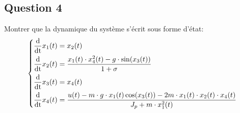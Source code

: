 \documentclass[class=article, crop=false]{standalone}
\begin{document}
\subsection{Question 4}
\begin{exercise}
    Montrer que la dynamique du système s'écrit sous forme d'état:
    \begin{equation}
        \begin{dcases}
            \frac{\text{d}}{\text{dt}} x_1(t) = x_2(t)\\
            \frac{\text{d}}{\text{dt}} x_2(t) = \frac{x_1(t) \cdot x^2_4(t) - g \cdot \sin(x_3(t))}{1 + \sigma}\\
            \frac{\text{d}}{\text{dt}} x_3(t) = x_4(t)\\
            \frac{\text{d}}{\text{dt}} x_4(t) = \frac{u(t) - m \cdot g \cdot x_1(t) \cos(x_3(t)) - 2 m \cdot x_1(t) \cdot x_2(t) \cdot x_4(t)}{J_p + m \cdot x^2_1(t)}\\
        \end{dcases}
    \end{equation}
\end{exercise}
\end{document}
